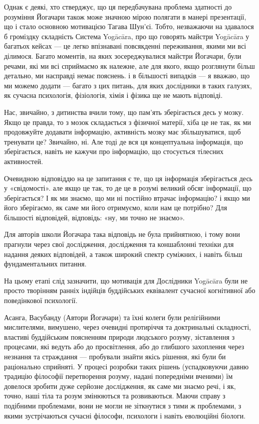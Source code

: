Однак є деякі, хто стверджує, що ця передбачувана проблема здатності
до розуміння Йогачари також може значною мірою полягати в манері презентації,
що і стало основною мотивацією Тагава Шун'єі. Тобто, незважаючи на
здавалося б громіздку складність Система Yogācāra, про що говорять
майстри Yogācāra у багатьох кейсах --- це легко впізнавані повсякденні
переживання, якими ми всі ділимося. Багато моментів, на яких
зосереджувалися майстри Йогачари, були речами, які ми всі сприймаємо
як належне, але для якого, якщо розглянути більш детально, ми
насправді немає пояснень. і в більшості випадків --- я вважаю,
що ми можемо додати --- багато з цих питань, для яких дослідники
в таких галузях, як сучасна психологія, фізіологія, хімія і фізика
ще не мають відповіді.

Нас, звичайно, з дитинства вчили тому, що пам'ять зберігається десь
у мозку. Якщо це правда, то з мозок складається з фізичної матерії,
хіба це не так, як ми продовжуйте додавати інформацію, активність
мозку має збільшуватися, щоб тренувати це? Звичайно, ні. Але тоді
де вся ця концептуальна інформація, що зберігається, навіть не кажучи
про інформацію, що стосується тілесних активностей.

Очевидною відповіддю на це запитання є те, що ця інформація
зберігається десь у «свідомості». але якщо це так, то де це в
розумі великий обсяг інформації, що зберігається? І як ми знаємо,
що ми ні постійно втрачає інформацію? і якщо ми його зберігаємо,
як саме ми його отримуємо, коли нам це потрібно? Для більшості
відповідей, відповідь: «ну, ми точно не знаємо».

Для авторів школи Йогачара така відповідь не була прийнятною, і
тому вони прагнули через свої дослідження, дослідження та коншаблонні
техніки для надання деяких відповідей, а також широкий спектр суміжних,
і навіть більш фундаментальних питання.

На цьому етапі слід зазначити, що мотивація для Дослідники Yogācāra
були не просто творінням ранніх індійців буддійських еквівалент
сучасної когнітивної або поведінкової психології.

Асанга, Васубанду (Автори Йогачари) та їхні колеги були релігійними
мислителями, вимушено, через очевидні протиріччя та доктринальні
складності, властиві буддійським поясненням природи людського розуму,
зіставлення з процесами, які ведуть або до просвітлення, або до
глибшого захоплення через незнання та страждання --- пробували
знайти якісь рішення, які були би раціонально сприйняті. У процесі
розробки таких рішень (успадковуючи давню традицію філософії
перетворення розуму, надані попередніми вченими) їм довелося
зробити дуже серйозне дослідження, як саме ми знаємо речі, і як,
точно, наші тіла та розум змінюються та розвиваються. Маючи справу
з подібними проблемами, вони не могли не зіткнутися з тими ж проблемами,
з якими зустрічаються сучасні філософи, психологи і навіть еволюційні біологи.


